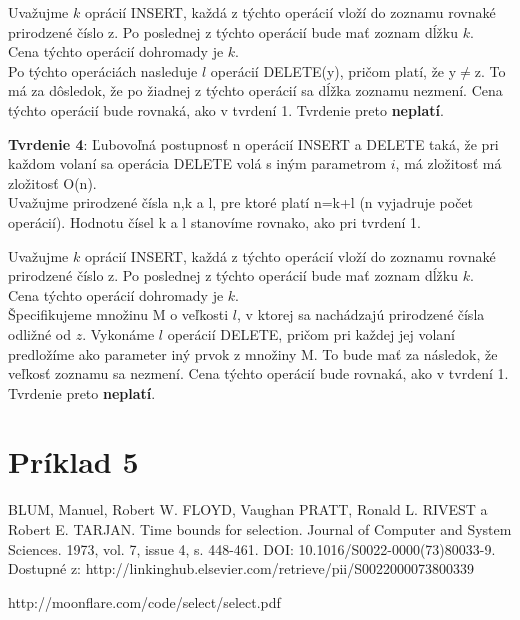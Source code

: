 \documentclass[paper=a4, fontsize=11pt]{scrartcl} %
\numberwithin{equation}{section} %
\numberwithin{figure}{section} %
\numberwithin{table}{section} %
\begin{document}
Uvažujme $k$ oprácií INSERT, každá z týchto operácií vloží do zoznamu rovnaké prirodzené číslo z.
Po poslednej z týchto operácií bude mať zoznam dĺžku $k$. \\

Cena týchto operácií dohromady je $k$. \\

Po týchto operáciách nasleduje $l$ operácií DELETE(y), pričom platí, že y$\neq$z. To má za dôsledok, že po žiadnej z týchto operácií sa dĺžka zoznamu nezmení. Cena týchto operácií bude rovnaká, ako v tvrdení 1.
Tvrdenie preto \textbf{neplatí}.

\textbf{Tvrdenie 4}: Ľubovoľná postupnosť n operácií INSERT a DELETE taká, že pri každom volaní sa operácia DELETE volá s iným parametrom $i$, má zložitosť má zložitosť O(n). \\

Uvažujme prirodzené čísla n,k a l, pre ktoré platí n=k+l (n vyjadruje počet operácií).
Hodnotu čísel k a l stanovíme rovnako, ako pri tvrdení 1.

Uvažujme $k$ oprácií INSERT, každá z týchto operácií vloží do zoznamu rovnaké prirodzené číslo z.
Po poslednej z týchto operácií bude mať zoznam dĺžku $k$. \\

Cena týchto operácií dohromady je $k$. \\

Špecifikujeme množinu M o veľkosti $l$, v ktorej sa nachádzajú prirodzené čísla odližné od $z$.
Vykonáme $l$ operácií DELETE, pričom pri každej jej volaní predložíme ako parameter iný prvok z množiny M.
To bude mať za následok, že veľkosť zoznamu sa nezmení. Cena týchto operácií bude rovnaká, ako v tvrdení 1.
Tvrdenie preto \textbf{neplatí}.





\pagebreak

\section*{Príklad 5}
\begin{thebibliography}{1}
 BLUM, Manuel, Robert W. FLOYD, Vaughan PRATT, Ronald L. RIVEST a Robert E. TARJAN.
Time bounds for selection.
Journal of Computer and System Sciences. 1973, vol. 7, issue 4, s. 448-461.
DOI: 10.1016/S0022-0000(73)80033-9.
Dostupné z: http://linkinghub.elsevier.com/retrieve/pii/S0022000073800339

 http://moonflare.com/code/select/select.pdf
\end{thebibliography}
\end{document}
